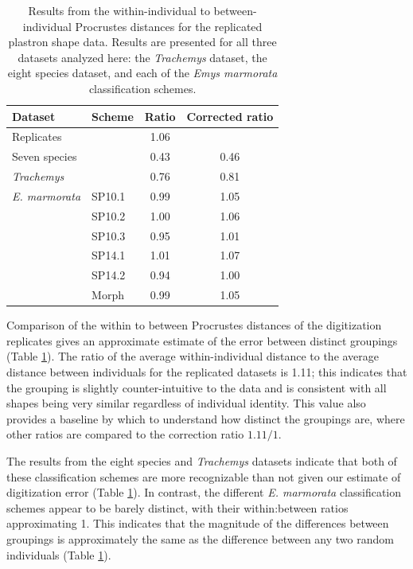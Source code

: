 \documentclass[10pt,letterpaper]{article}
\begin{document}
\begin{table}
  \centering
  \caption{Results from the within-individual to between-individual Procrustes distances for the replicated plastron shape data. Results are presented for all three datasets analyzed here: the \textit{Trachemys} dataset, the eight species dataset, and each of the \textit{Emys marmorata} classification schemes.}
  \begin{tabular}{l l c c}
    \textbf{Dataset} & \textbf{Scheme} & \textbf{Ratio} & \textbf{Corrected ratio} \\
    \hline
    Replicates & & 1.06 & \\
    \hline
    Seven species & & 0.43 & 0.46 \\
    \textit{Trachemys} & & 0.76 & 0.81 \\
    \hline
    \textit{E. marmorata} & SP10.1 & 0.99 & 1.05 \\
     & SP10.2 & 1.00 & 1.06 \\
     & SP10.3 & 0.95 & 1.01 \\
     & SP14.1 & 1.01 & 1.07 \\
     & SP14.2 & 0.94 & 1.00 \\
     & Morph & 0.99 & 1.05 \\
    \hline
  \end{tabular}
  \label{tab:rep_res}
\end{table}

Comparison of the within to between Procrustes distances of the digitization replicates gives an approximate estimate of the error between distinct groupings (Table \ref{tab:rep_res}). The ratio of the average within-individual distance to the average distance between individuals for the replicated datasets is 1.11; this indicates that the grouping is slightly counter-intuitive to the data and is consistent with all shapes being very similar regardless of individual identity. This value also provides a baseline by which to understand how distinct the groupings are, where other ratios are compared to the correction ratio \(1.11/1\). 

The results from the eight species and \textit{Trachemys} datasets indicate that both of these classification schemes are more recognizable than not given our estimate of digitization error (Table \ref{tab:rep_res}). In contrast, the different \textit{E. marmorata} classification schemes appear to be barely distinct, with their within:between ratios approximating 1. This indicates that the magnitude of the differences between groupings is approximately the same as the difference between any two random individuals (Table \ref{tab:rep_res}).
\end{document}
